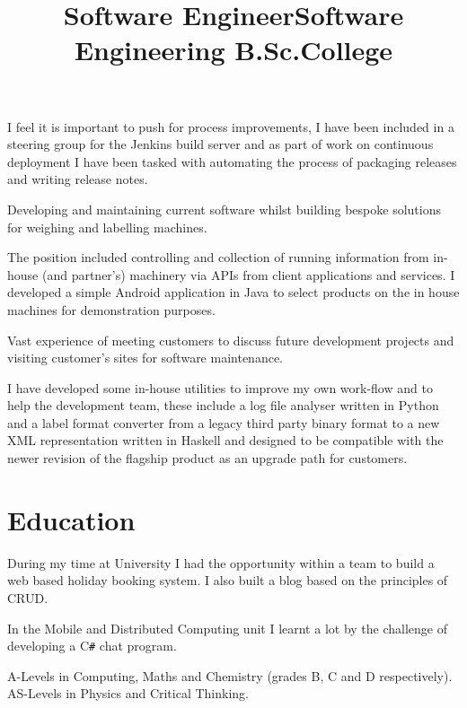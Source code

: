 \documentclass[line,margin]{res}
\newcommand{\CSharp}{C\texttt{\#}}
\begin{document}
\begin{resume}
\begin{position}
I feel it is important to push for process improvements,
I have been included in a steering group for the Jenkins build server and
as part of work on continuous deployment
I have been tasked with automating the process of packaging releases and
writing release notes.
\end{position}

\title{Software Engineer}
\begin{position}
Developing and maintaining current software whilst building bespoke solutions
for weighing and labelling machines.

The position included controlling and collection of running information from
in-house (and partner's) machinery via APIs from
client applications and services.
I developed a simple Android application in Java to select products on the
in house machines for demonstration purposes.

Vast experience of meeting customers to discuss future development projects and
visiting customer's sites for software maintenance.

I have developed some in-house utilities to improve my own work-flow and
to help the development team,
these include a log file analyser written in Python and
a label format converter from a legacy third party binary format to
a new XML representation written in Haskell and
designed to be compatible with the newer revision of the flagship product
as an upgrade path for customers.
\end{position}

\section{Education}

\title{Software Engineering B.Sc.} %
\begin{position}
During my time at University I had the opportunity within a team to build
a web based holiday booking system.
I also built a blog based on the principles of CRUD.

In the Mobile and Distributed Computing unit I learnt a lot by the challenge of
developing a {\CSharp} chat program.
\end{position}

\title{College}
\begin{position}
A-Levels in Computing, Maths and Chemistry (grades B, C and D respectively). \\
AS-Levels in Physics and Critical Thinking.


\end{position}
\end{resume}
\end{document}
